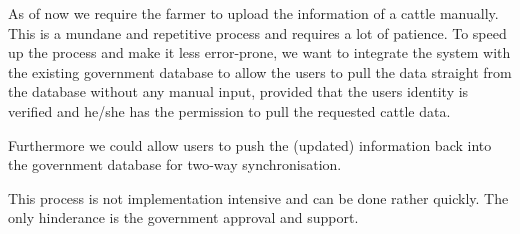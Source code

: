 As of now we require the farmer to upload the information of a cattle manually. This is a mundane and repetitive process and requires a lot of patience. To speed up the process and make it less error-prone, we want to integrate the system with the existing government database to allow the users to pull the data straight from the database without any manual input, provided that the users identity is verified and he/she has the permission to pull the requested cattle data.

Furthermore we could allow users to push the (updated) information back into the government database for two-way synchronisation.

This process is not implementation intensive and can be done rather quickly. The only hinderance is the government approval and support.
